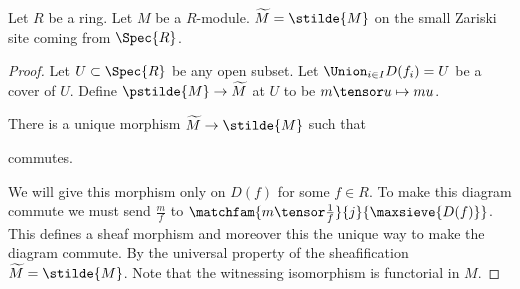 \begin{lemma}
Let $R$ be a ring.
Let $M$ be a $R$-module.
$\widetilde{M} = \stilde{M}$ on the small Zariski site coming from $\Spec{R}$.
\end{lemma}

\begin{proof}
Let $U\subset \Spec{R}$ be any open subset.
Let $\Union_{i\in I} D(f_i) = U$ be a cover of $U$.
Define $\pstilde{M} \rightarrow \widetilde{M}$
at $U$ to be $m\tensor u \mapsto mu$.

There is a unique morphism $\widetilde{M} \rightarrow \stilde{M}$
such that 
\begin{center}
\end{center}
commutes.

We will give this morphism only on $D(f)$ for some $f\in R$.
To make this diagram commute we must send $\frac{m}{f}$
to $\matchfam{m\tensor \frac{1}{f}}{j}{\maxsieve{D(f)}}$.
This defines a sheaf morphism and moreover this the unique way to make the diagram commute.
By the universal property of the sheafification $\widetilde{M} = \stilde{M}$.
Note that the witnessing isomorphism is functorial in $M$. 
\end{proof}